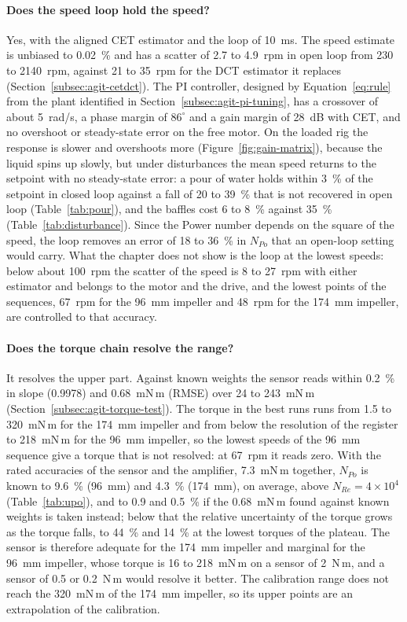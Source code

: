 \paragraph{Does the speed loop hold the speed?}
Yes, with the aligned CET estimator and the loop of 10~ms. The speed estimate is unbiased to 0.02~\% and has a scatter of 2.7 to 4.9~rpm in open loop from 230 to 2140~rpm, against 21 to 35~rpm for the DCT estimator it replaces (Section~\ref{subsec:agit-cetdct}). The PI controller, designed by Equation~\ref{eq:rule} from the plant identified in Section~\ref{subsec:agit-pi-tuning}, has a crossover of about 5~rad/s, a phase margin of $86^{\circ}$ and a gain margin of 28~dB with CET, and no overshoot or steady-state error on the free motor. On the loaded rig the response is slower and overshoots more (Figure~\ref{fig:gain-matrix}), because the liquid spins up slowly, but under disturbances the mean speed returns to the setpoint with no steady-state error: a pour of water holds within 3~\% of the setpoint in closed loop against a fall of 20 to 39~\% that is not recovered in open loop (Table~\ref{tab:pour}), and the baffles cost 6 to 8~\% against 35~\% (Table~\ref{tab:disturbance}). Since the Power number depends on the square of the speed, the loop removes an error of 18 to 36~\% in $N_{Po}$ that an open-loop setting would carry. What the chapter does not show is the loop at the lowest speeds: below about 100~rpm the scatter of the speed is 8 to 27~rpm with either estimator and belongs to the motor and the drive, and the lowest points of the sequences, 67~rpm for the 96~mm impeller and 48~rpm for the 174~mm impeller, are controlled to that accuracy.

\paragraph{Does the torque chain resolve the range?}
It resolves the upper part. Against known weights the sensor reads within 0.2~\% in slope (0.9978) and 0.68~mN\,m (RMSE) over 24 to 243~mN\,m (Section~\ref{subsec:agit-torque-test}). The torque in the best runs runs from 1.5 to 320~mN\,m for the 174~mm impeller and from below the resolution of the register to 218~mN\,m for the 96~mm impeller, so the lowest speeds of the 96~mm sequence give a torque that is not resolved: at 67~rpm it reads zero. With the rated accuracies of the sensor and the amplifier, 7.3~mN\,m together, $N_{Po}$ is known to 9.6~\% (96~mm) and 4.3~\% (174~mm), on average, above $N_{Re} = 4\times10^{4}$ (Table~\ref{tab:upo}), and to 0.9 and 0.5~\% if the 0.68~mN\,m found against known weights is taken instead; below that the relative uncertainty of the torque grows as the torque falls, to 44~\% and 14~\% at the lowest torques of the plateau. The sensor is therefore adequate for the 174~mm impeller and marginal for the 96~mm impeller, whose torque is 16 to 218~mN\,m on a sensor of 2~N\,m, and a sensor of 0.5 or 0.2~N\,m would resolve it better. The calibration range does not reach the 320~mN\,m of the 174~mm impeller, so its upper points are an extrapolation of the calibration.

